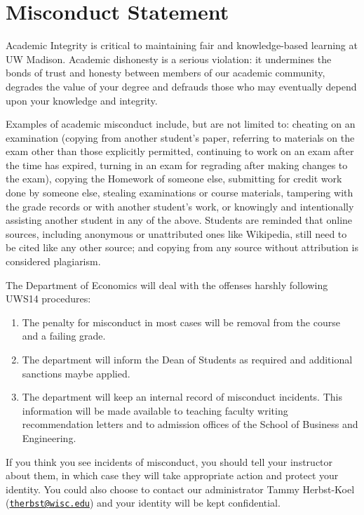 \documentclass[
]{book}
\begin{document}
\hypertarget{misconduct-statement}{%
\section{Misconduct Statement}\label{misconduct-statement}}

Academic Integrity is critical to maintaining fair and knowledge-based learning at UW Madison. Academic dishonesty is a serious violation: it undermines the bonds of trust and honesty between members of our academic community, degrades the value of your degree and defrauds those who may eventually depend upon your knowledge and integrity.

Examples of academic misconduct include, but are not limited to: cheating on an examination (copying from another student's paper, referring to materials on the exam other than those explicitly permitted, continuing to work on an exam after the time has expired, turning in an exam for regrading after making changes to the exam), copying the Homework of someone else, submitting for credit work done by someone else, stealing examinations or course materials, tampering with the grade records or with another student's work, or knowingly and intentionally assisting another student in any of the above. Students are reminded that online sources, including anonymous or unattributed ones like Wikipedia, still need to be cited like any other source; and copying from any source without attribution is considered plagiarism.

The Department of Economics will deal with the offenses harshly following UWS14 procedures:

\begin{enumerate}
\def\labelenumi{\arabic{enumi}.}
\item
  The penalty for misconduct in most cases will be removal from the course and a failing grade.
\item
  The department will inform the Dean of Students as required and additional sanctions maybe applied.
\item
  The department will keep an internal record of misconduct incidents. This information will be made available to teaching faculty writing recommendation letters and to admission offices of the School of Business and Engineering.
\end{enumerate}

If you think you see incidents of misconduct, you should tell your instructor about them, in which case they will take appropriate action and protect your identity. You could also choose to contact our administrator Tammy Herbst-Koel (\href{mailto:therbst@wisc.edu}{\nolinkurl{therbst@wisc.edu}}) and your identity will be kept confidential.
\end{document}
